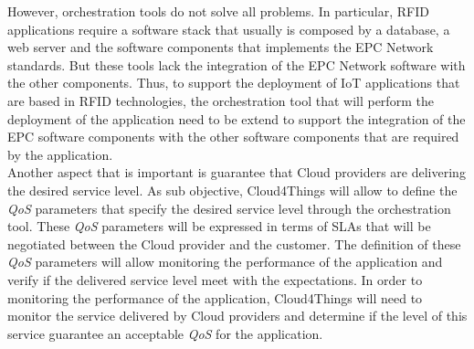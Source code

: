 However, orchestration tools do not solve all problems. In particular, RFID applications require a
software stack that usually is composed by a database, a web server and the software components
that implements the EPC Network standards. But these tools lack the integration of the EPC
Network software with the other components. Thus, to support the deployment of IoT applications
that are based in RFID technologies, the orchestration tool that will perform the deployment
of the application need to be extend to support the integration of the EPC software components
with the other software components that are required by the application.\\

Another aspect that is important is guarantee that Cloud providers are delivering
the desired service level. As sub objective, Cloud4Things will allow to define the
\textit{QoS} parameters that specify the desired service level through the orchestration
tool. These \textit{QoS} parameters will be expressed in terms of SLAs that will be
negotiated between the Cloud provider and the customer. The definition of these \textit{QoS}
parameters will allow monitoring the performance of the application and verify if the
delivered service level meet with the expectations. In order to monitoring the performance
of the application, Cloud4Things will need to monitor the service delivered by Cloud
providers and determine if the level of this service guarantee an
acceptable \textit{QoS} for the application.
